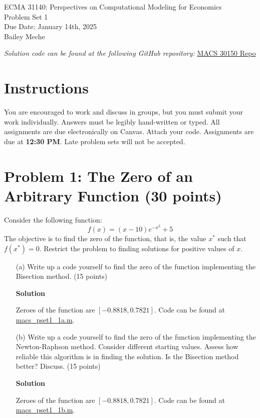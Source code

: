 \documentclass[12pt]{article}
\begin{document}
	\begin{center}
		ECMA 31140: Perspectives on Computational Modeling for Economics\\
        Problem Set 1\\
		Due Date: January 14th, 2025 \\
        Bailey Meche
	\end{center}

\emph{Solution code can be found at the following GitHub repository:} \href{https://github.com/BaileyMeche/macs30150_Winter25}{MACS 30150 Repo}

\section*{Instructions}

You are encouraged to work and discuss in groups, but you must submit your work individually. Answers must be legibly hand-written or typed. All assignments are due electronically on Canvas. Attach your code. Assignments are due at \textbf{12:30 PM}. Late problem sets will not be accepted.



\section*{Problem 1: The Zero of an Arbitrary Function (30 points)}

Consider the following function:
\[
f(x) = (x - 10)e^{-x^2} + 5
\]
The objective is to find the zero of the function, that is, the value \(x^*\) such that \(f(x^*) = 0\). Restrict the problem to finding solutions for positive values of \(x\).

\begin{enumerate}
    \item[(a)] Write up a code yourself to find the zero of the function implementing the {Bisection method}. (15 points)

    \textbf{Solution}

    Zeroes of the function are $[-0.8818,    0.7821]$. Code can be found at \url{macs_pset1_1a.m}.

    
    \item[(b)] Write up a code yourself to find the zero of the function implementing the {Newton-Raphson method}. Consider different starting values. Assess how reliable this algorithm is in finding the solution. Is the Bisection method better? Discuss. (15 points)

    \textbf{Solution}

    Zeroes of the function are $[-0.8818,    0.7821]$. Code can be found at \url{macs_pset1_1b.m}.
    
\end{enumerate}
\end{document}
